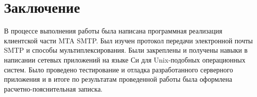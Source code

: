 \documentclass[a4paper,12pt]{report}
\begin{document}
\clearpage
\chapter*{Заключение}

В процессе выполнения работы была написана программная реализация клиентской части MTA SMTP. Был изучен протокол передачи электронной почты SMTP и способы мультиплексирования. Были закреплены и получены навыки в написании сетевых приложений на языке Си для Unix-подобных операционных систем. Было проведено тестирование и отладка разработанного серверного приложения и в итоге по результатам проведенной работы была оформлена расчетно-пояснительная записка.
\end{document}
